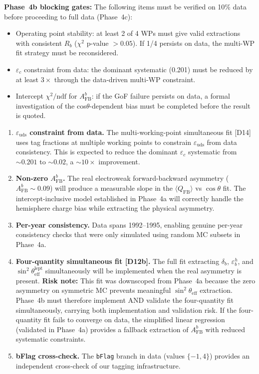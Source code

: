 \documentclass[11pt,a4paper]{article}
\begin{document}
\textbf{Phase~4b blocking gates:} The following items must be verified on 10\% data
before proceeding to full data (Phase~4c):
\begin{itemize}
\item Operating point stability: at least 2 of 4 WPs must give valid extractions
with consistent $R_b$ ($\chi^2$ p-value $> 0.05$). If 1/4 persists on data,
the multi-WP fit strategy must be reconsidered.
\item $\varepsilon_c$ constraint from data: the dominant systematic (0.201) must be
reduced by at least $3\times$ through the data-driven multi-WP constraint.
\item Intercept $\chi^2/\mathrm{ndf}$ for $A_\mathrm{FB}^b$: if the GoF failure
persists on data, a formal investigation of the cos$\theta$-dependent bias must
be completed before the result is quoted.
\end{itemize}

\begin{enumerate}
\item \textbf{$\varepsilon_\mathrm{uds}$ constraint from data.} The multi-working-point
simultaneous fit [D14] uses tag fractions at multiple working points to constrain
$\varepsilon_\mathrm{uds}$ from data consistency. This is expected to reduce the
dominant $\varepsilon_c$ systematic from $\sim 0.201$ to $\sim 0.02$, a $\sim 10\times$ improvement.

\item \textbf{Non-zero $A_\mathrm{FB}^b$.} The real electroweak forward-backward
asymmetry ($A_\mathrm{FB}^b \sim 0.09$) will produce a measurable slope in the
$\langle Q_\mathrm{FB} \rangle$ vs $\cos\theta$ fit. The intercept-inclusive model
established in Phase~4a will correctly handle the hemisphere charge bias while
extracting the physical asymmetry.

\item \textbf{Per-year consistency.} Data spans 1992--1995, enabling genuine per-year
consistency checks that were only simulated using random MC subsets in Phase~4a.

\item \textbf{Four-quantity simultaneous fit [D12b].} The full fit extracting
$\delta_b$, $\varepsilon_b^h$, and $\sin^2\theta_\mathrm{eff}^\mathrm{lept}$
simultaneously will be implemented when the real asymmetry is present.
\textbf{Risk note:} This fit was downscoped from Phase~4a because the
zero asymmetry on symmetric MC prevents meaningful $\sin^2\theta_\mathrm{eff}$
extraction. Phase~4b must therefore implement AND validate the four-quantity
fit simultaneously, carrying both implementation and validation risk. If
the four-quantity fit fails to converge on data, the simplified linear
regression (validated in Phase~4a) provides a fallback extraction of
$A_\mathrm{FB}^b$ with reduced systematic constraints.

\item \textbf{bFlag cross-check.} The \texttt{bFlag} branch in data (values $\{-1, 4\}$)
provides an independent cross-check of our tagging infrastructure.
\end{enumerate}
\end{document}
